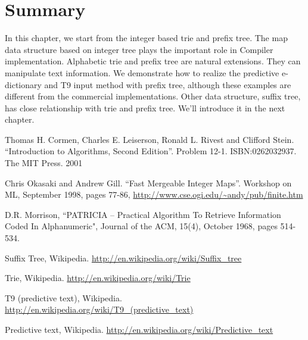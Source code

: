 \documentclass{article}
\begin{document}
\section{Summary}

In this chapter, we start from the integer based trie and prefix tree. The
map data structure based on integer tree plays the important role
in Compiler implementation. Alphabetic trie and prefix tree are
natural extensions. They can manipulate text information.
We demonstrate how to realize the predictive e-dictionary
and T9 input method with prefix tree, although these examples
are different from the commercial implementations.
Other data structure, suffix tree, has close
relationship with trie and prefix tree. We'll introduce it in the next chapter.

\begin{thebibliography}{99}

Thomas H. Cormen, Charles E. Leiserson, Ronald L. Rivest and Clifford Stein.
``Introduction to Algorithms, Second Edition''. Problem 12-1. ISBN:0262032937. The MIT Press. 2001

Chris Okasaki and Andrew Gill. ``Fast Mergeable Integer
Maps''. Workshop on ML, September 1998, pages 77-86, \url{http://www.cse.ogi.edu/~andy/pub/finite.htm}

D.R. Morrison, ``PATRICIA -- Practical Algorithm To Retrieve  Information Coded In Alphanumeric", Journal of the ACM, 15(4), October 1968, pages 514-534.

Suffix Tree, Wikipedia. \url{http://en.wikipedia.org/wiki/Suffix_tree}

Trie, Wikipedia. \url{http://en.wikipedia.org/wiki/Trie}

T9 (predictive text), Wikipedia. \url{http://en.wikipedia.org/wiki/T9_(predictive_text)}

Predictive text,
Wikipedia. \url{http://en.wikipedia.org/wiki/Predictive_text}

\end{thebibliography}

\ifx\wholebook\relax\else
\end{document}
